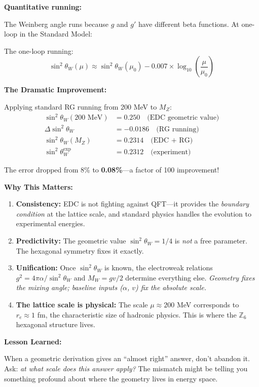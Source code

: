 \begin{tcolorbox}[colback=yellow!5, colframe=orange!60!black,
  title={Historical Note: How This Chapter Evolved}, breakable]
\textbf{Quantitative running:}

The Weinberg angle runs because $g$ and $g'$ have different beta functions.
At one-loop in the Standard Model:

The one-loop running:
\begin{equation}
\sin^2\theta_W(\mu) \approx \sin^2\theta_W(\mu_0) - 0.007 \times \log_{10}\left(\frac{\mu}{\mu_0}\right)
\end{equation}

\textbf{The Dramatic Improvement:}

Applying standard RG running from 200 MeV to $M_Z$:
\begin{align}
\sin^2\theta_W(200\text{ MeV}) &= 0.250 \quad \text{(EDC geometric value)} \\
\Delta\sin^2\theta_W &= -0.0186 \quad \text{(RG running)} \\
\sin^2\theta_W(M_Z) &= 0.2314 \quad \text{(EDC + RG)} \\
\sin^2\theta_W^{\text{exp}} &= 0.2312 \quad \text{(experiment)}
\end{align}

The error dropped from 8\% to \textbf{0.08\%}---a factor of 100 improvement!

\textbf{Why This Matters:}

\begin{enumerate}
\item \textbf{Consistency:} EDC is not fighting against QFT---it provides the
      \emph{boundary condition} at the lattice scale, and standard physics
      handles the evolution to experimental energies.

\item \textbf{Predictivity:} The geometric value $\sin^2\theta_W = 1/4$ is
      \emph{not} a free parameter. The hexagonal symmetry fixes it exactly.

\item \textbf{Unification:} Once $\sin^2\theta_W$ is known, the electroweak
      relations $g^2 = 4\pi\alpha/\sin^2\theta_W$ and $M_W = gv/2$ determine
      everything else. \emph{Geometry fixes the mixing angle; baseline inputs
      \tagBL{} ($\alpha$, $v$) fix the absolute scale.}

\item \textbf{The lattice scale is physical:} The scale $\mu \approx 200$ MeV
      corresponds to $r_e \approx 1$ fm, the characteristic size of hadronic
      physics. This is where the $\mathbb{Z}_6$ hexagonal structure lives.
\end{enumerate}

\textbf{Lesson Learned:}

When a geometric derivation gives an ``almost right'' answer, don't abandon it.
Ask: \emph{at what scale does this answer apply?} The mismatch might be telling
you something profound about where the geometry lives in energy space.

\end{tcolorbox}

